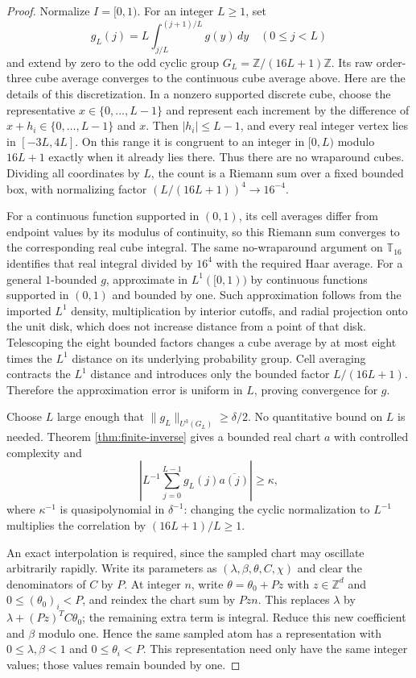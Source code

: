\documentclass[11pt]{article}
\theoremstyle{definition}
\newcommand{\Z}{\mathbb Z}
\newcommand{\T}{\mathbb T}
\numberwithin{equation}{section}
\begin{document}
\begin{proof}
Normalize $I=[0,1)$. For an integer $L\ge1$, set
\[
 g_L(j)=L\int_{j/L}^{(j+1)/L}g(y)\,dy\quad(0\le j<L)
\]
and extend by zero to the odd cyclic group $G_L=\Z/(16L+1)\Z$. Its raw order-three cube average converges to the continuous cube average above. Here are the details of this discretization. In a nonzero supported discrete cube, choose the representative $x\in\{0,\ldots,L-1\}$ and represent each increment by the difference of $x+h_i\in\{0,\ldots,L-1\}$ and $x$. Then $|h_i|\le L-1$, and every real integer vertex lies in $[-3L,4L]$. On this range it is congruent to an integer in $[0,L)$ modulo $16L+1$ exactly when it already lies there. Thus there are no wraparound cubes. Dividing all coordinates by $L$, the count is a Riemann sum over a fixed bounded box, with normalizing factor $(L/(16L+1))^4\to16^{-4}$.

For a continuous function supported in $(0,1)$, its cell averages differ from endpoint values by its modulus of continuity, so this Riemann sum converges to the corresponding real cube integral. The same no-wraparound argument on $\T_{16}$ identifies that real integral divided by $16^4$ with the required Haar average. For a general $1$-bounded $g$, approximate in $L^1([0,1))$ by continuous functions supported in $(0,1)$ and bounded by one. Such approximation follows from the imported $L^1$ density, multiplication by interior cutoffs, and radial projection onto the unit disk, which does not increase distance from a point of that disk. Telescoping the eight bounded factors changes a cube average by at most eight times the $L^1$ distance on its underlying probability group. Cell averaging contracts the $L^1$ distance and introduces only the bounded factor $L/(16L+1)$. Therefore the approximation error is uniform in $L$, proving convergence for $g$.

Choose $L$ large enough that $\|g_L\|_{U^3(G_L)}\ge\delta/2$. No quantitative bound on $L$ is needed. Theorem \ref{thm:finite-inverse} gives a bounded real chart $a$ with controlled complexity and
\[
 \left|L^{-1}\sum_{j=0}^{L-1}g_L(j)\overline{a(j)}\right|\ge\kappa,
\]
where $\kappa^{-1}$ is quasipolynomial in $\delta^{-1}$: changing the cyclic normalization to $L^{-1}$ multiplies the correlation by $(16L+1)/L\ge1$.

An exact interpolation is required, since the sampled chart may oscillate arbitrarily rapidly. Write its parameters as $(\lambda,\beta,\theta,C,\chi)$ and clear the denominators of $C$ by $P$. At integer $n$, write $\theta=\theta_0+Pz$ with $z\in\Z^d$ and $0\le(\theta_0)_i<P$, and reindex the chart sum by $Pzn$. This replaces $\lambda$ by $\lambda+(Pz)^TC\theta_0$; the remaining extra term is integral. Reduce this new coefficient and $\beta$ modulo one. Hence the same sampled atom has a representation with $0\le\lambda,\beta<1$ and $0\le\theta_i<P$. This representation need only have the same integer values; those values remain bounded by one.


\end{proof}
\end{document}
